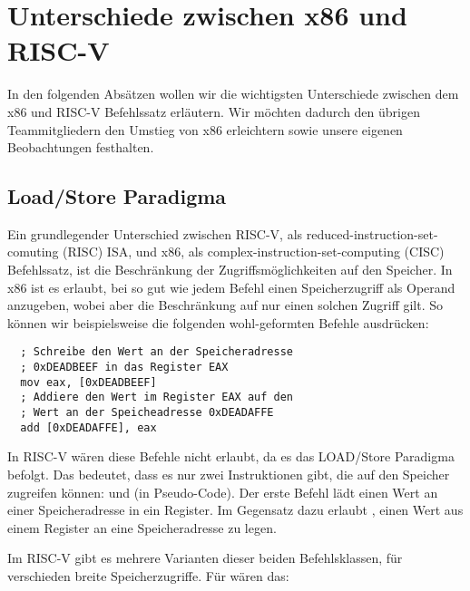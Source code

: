 \section{Unterschiede zwischen x86 und RISC-V}

In den folgenden Absätzen wollen wir die wichtigsten Unterschiede zwischen dem
x86 und RISC-V Befehlssatz erläutern. Wir möchten dadurch den übrigen
Teammitgliedern den Umstieg von x86 erleichtern sowie unsere eigenen
Beobachtungen festhalten.

\subsection{Load/Store Paradigma}

Ein grundlegender Unterschied zwischen RISC-V, als
reduced-instruction-set-comuting (RISC) ISA, und x86, als
complex-instruction-set-computing (CISC) Befehlssatz, ist die Beschränkung der
Zugriffsmöglichkeiten auf den Speicher. In x86 ist es erlaubt, bei so gut wie
jedem Befehl einen Speicherzugriff als Operand anzugeben, wobei aber die
Beschränkung auf nur einen solchen Zugriff gilt. So können wir beispielsweise
die folgenden wohl-geformten Befehle ausdrücken:

\begin{lstlisting}
  ; Schreibe den Wert an der Speicheradresse
  ; 0xDEADBEEF in das Register EAX
  mov eax, [0xDEADBEEF]
  ; Addiere den Wert im Register EAX auf den
  ; Wert an der Speicheadresse 0xDEADAFFE
  add [0xDEADAFFE], eax
\end{lstlisting}

In RISC-V wären diese Befehle nicht erlaubt, da es das LOAD/Store Paradigma
befolgt. Das bedeutet, dass es nur zwei Instruktionen gibt, die auf den Speicher
zugreifen können:  und  (in Pseudo-Code). Der erste
Befehl lädt einen Wert an einer Speicheradresse in ein Register. Im
Gegensatz dazu erlaubt , einen Wert aus einem Register an eine
Speicheradresse zu legen.

Im RISC-V gibt es mehrere Varianten dieser beiden Befehlsklassen, für
verschieden breite Speicherzugriffe. Für  wären das:

